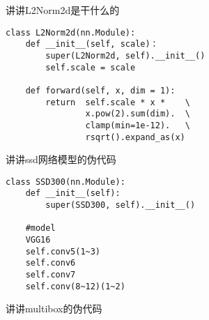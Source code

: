{\huge 讲讲L2Norm2d是干什么的}
\begin{lstlisting}[caption={L2Norm2d}]
class L2Norm2d(nn.Module):
	def __init__(self, scale)：
		super(L2Norm2d, self).__init__()
		self.scale = scale
		
	def forward(self, x, dim = 1):
		return  self.scale * x *    \
				x.pow(2).sum(dim).  \
				clamp(min=1e-12).	\
				rsqrt().expand_as(x)
\end{lstlisting}
{\huge 讲讲ssd网络模型的伪代码}
\begin{lstlisting}[caption={SSD layer}]
class SSD300(nn.Module):
	def __init__(self):
		super(SSD300, self).__init__()
	
	#model
	VGG16
	self.conv5(1~3)
	self.conv6
	self.conv7
	self.conv(8~12)(1~2)
\end{lstlisting}
{\huge 讲讲multibox的伪代码}
\begin{lstlisting}[caption={Multibox layer}]

\end{lstlisting}